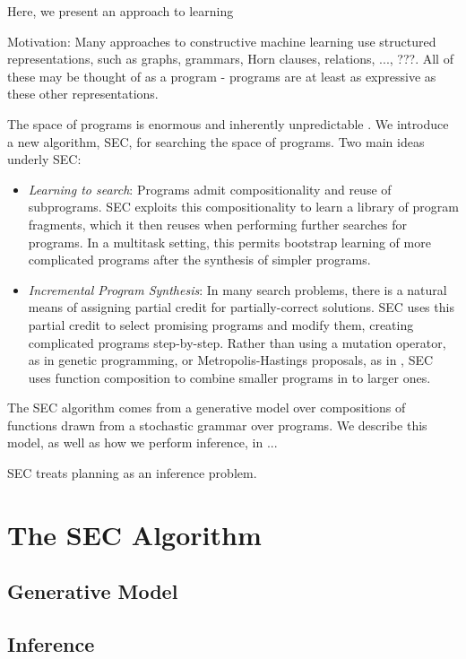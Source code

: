 \documentclass{article} %
\begin{document}

Here, we present an approach to learning 

Motivation: Many approaches to constructive machine learning use structured representations, such as graphs, grammars, Horn clauses, relations, ..., ???. All of these may be thought of as a program - programs are at least as expressive as these other representations.

The space of programs is enormous and inherently unpredictable \cite{PACunpredictability}.
We introduce a new algorithm, SEC, for searching the space of programs.
Two main ideas underly SEC:
\begin{itemize}
\item \emph{Learning to search}: Programs admit compositionality and reuse of subprograms. SEC exploits this compositionality to learn a library of program fragments, which it then reuses when performing further searches for programs.
In a multitask setting, this permits bootstrap learning of more complicated programs after the synthesis of simpler programs.
\item \emph{Incremental Program Synthesis}: In many search problems, there is a natural means of assigning partial credit for partially-correct solutions. SEC uses this partial credit to select promising programs and modify them, creating complicated programs step-by-step.
Rather than using a mutation operator, as in genetic programming, or Metropolis-Hastings proposals, as in \cite{MHprogramInduction}, SEC uses function composition to combine smaller programs in to larger ones.
\end{itemize}

The SEC algorithm comes from a generative model over compositions of functions drawn from a stochastic grammar over programs.
We describe this model, as well as how we perform inference, in ...

SEC treats planning as an inference problem.

\section{The SEC Algorithm}
\subsection{Generative Model}
\subsection{Inference}
\end{document}
